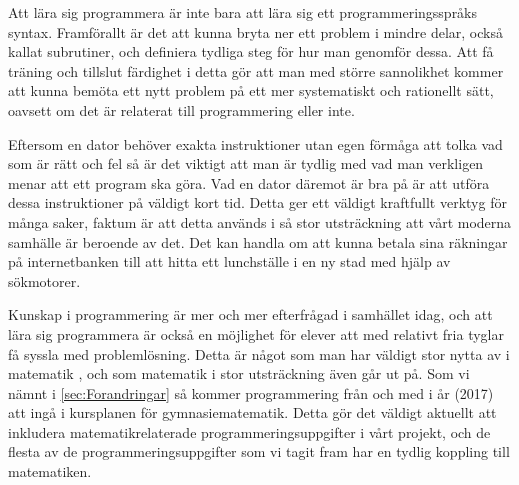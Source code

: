 \textcolor{Mahogany}{Att lära sig programmera är inte bara att lära sig ett programmeringsspråks syntax. Framförallt är det att kunna bryta ner ett problem i mindre delar, också kallat subrutiner, och definiera tydliga steg för hur man genomför dessa. Att få träning och tillslut färdighet i detta gör att man med större sannolikhet kommer att kunna bemöta ett nytt problem på ett mer systematiskt och rationellt sätt, oavsett om det är relaterat till programmering eller inte.}

\textcolor{Mahogany}{Eftersom en dator behöver exakta instruktioner utan egen förmåga att tolka vad som är rätt och fel så är det viktigt att man är tydlig med vad man verkligen menar att ett program ska göra. Vad en dator däremot är bra på är att utföra dessa instruktioner på väldigt kort tid. Detta ger ett väldigt kraftfullt verktyg för många saker, faktum är att detta används i så stor utsträckning att vårt moderna samhälle är beroende av det. Det kan handla om att kunna betala sina räkningar på internetbanken till att hitta ett lunchställe i en ny stad med hjälp av sökmotorer.}

\textcolor{Mahogany}{
    Kunskap i programmering är mer och mer efterfrågad i samhället idag, och att lära sig programmera är också en möjlighet för elever att med relativt fria tyglar få syssla med problemlösning. Detta är något som man har väldigt stor nytta av i matematik \cite{TheElephant}, och som matematik i stor utsträckning även går ut på. Som vi nämnt i \ref{sec:Forandringar} så kommer programmering från och med i år (2017) att ingå i kursplanen för gymnasiematematik. Detta gör det väldigt aktuellt att inkludera matematikrelaterade programmeringsuppgifter i vårt projekt, och de flesta av de programmeringsuppgifter som vi tagit fram har en tydlig koppling till matematiken.
}